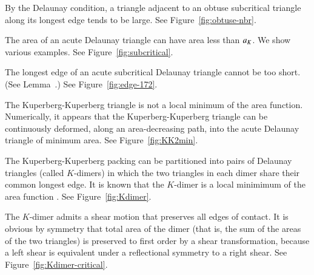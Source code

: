 
\begin{example} By the Delaunay condition, a triangle adjacent to an obtuse subcritical
triangle along its longest edge tends to be large. See Figure~\ref{fig:obtuse-nbr}.
\end{example}


\begin{example} The area of an acute Delaunay triangle can have area less than
$a_K$.  We show various examples.  See Figure~\ref{fig:subcritical}.
\end{example}


\begin{example} The longest edge of an acute subcritical Delaunay triangle cannot be too short.
(See Lemma~.) See Figure~\ref{fig:edge-172}.
\end{example}


\begin{example}  The Kuperberg-Kuperberg triangle is not a local minimum of the area function.
Numerically, it appears that the Kuperberg-Kuperberg triangle can be continuously deformed, along an area-decreasing
path, into the acute Delaunay triangle of minimum area. See Figure~\ref{fig:KK2min}.
\end{example}


\begin{example}  The Kuperberg-Kuperberg packing can be partitioned into pairs
of Delaunay triangles (called $K$-dimers) in which the two triangles
in each dimer share their common longest edge.  It is known that the $K$-dimer is a local
minimimum of the area function \cite{Kus}. See Figure~\ref{fig:Kdimer}.
\end{example}


\begin{example} The $K$-dimer admits a shear motion that preserves all edges of contact.
It is obvious by symmetry that total area of the dimer (that is, the sum of the areas of the two triangles)
is preserved to first order by a shear transformation, 
because a left shear is equivalent under a reflectional symmetry to a right shear.
See Figure~\ref{fig:Kdimer-critical}.
\end{example}

